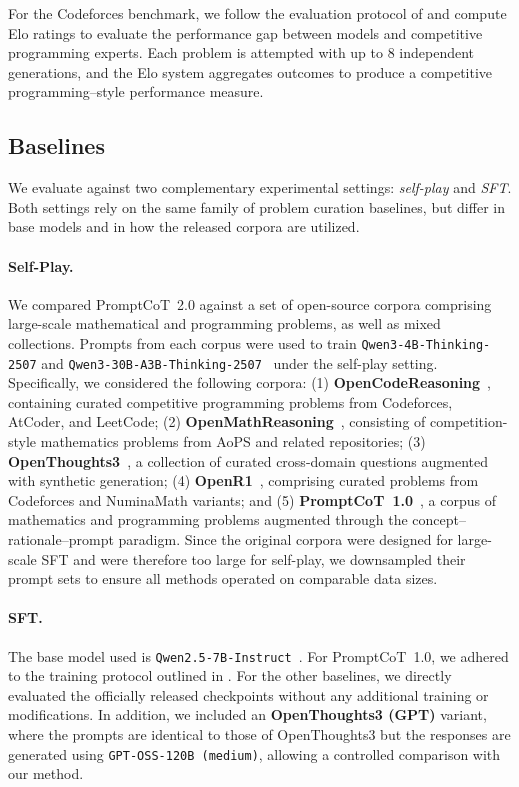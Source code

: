 For the Codeforces benchmark, we follow the evaluation protocol of \citet{luo2025deepcoder} and compute Elo ratings to evaluate the performance gap between models and competitive programming experts.
Each problem is attempted with up to 8 independent generations, and the Elo system aggregates outcomes to produce a competitive programming–style performance measure.  

\subsection{Baselines}

We evaluate against two complementary experimental settings: \emph{self-play} and \emph{SFT}. 
Both settings rely on the same family of problem curation baselines, but differ in base models and in how the released corpora are utilized.

\paragraph{Self-Play.}
We compared PromptCoT~2.0 against a set of open-source corpora comprising large-scale mathematical and programming problems, as well as mixed collections. Prompts from each corpus were used to train \texttt{Qwen3-4B-Thinking-2507} and \texttt{Qwen3-30B-A3B-Thinking-2507}~\citep{yang2025qwen3} under the self-play setting. Specifically, we considered the following corpora:
(1) \textbf{OpenCodeReasoning}~\citep{ahmad2025opencodereasoning}, containing curated competitive programming problems from Codeforces, AtCoder, and LeetCode;
(2) \textbf{OpenMathReasoning}~\citep{moshkov2025aimo}, consisting of competition-style mathematics problems from AoPS and related repositories;
(3) \textbf{OpenThoughts3}~\citep{guha2025openthoughts}, a collection of curated cross-domain questions augmented with synthetic generation;
(4) \textbf{OpenR1}~\citep{openr1}, comprising curated problems from Codeforces and NuminaMath variants; and
(5) \textbf{PromptCoT~1.0}~\citep{zhao2025promptcot,zhao2025scaling}, a corpus of mathematics and programming problems augmented through the concept–rationale–prompt paradigm. Since the original corpora were designed for large-scale SFT and were therefore too large for self-play, we downsampled their prompt sets to ensure all methods operated on comparable data sizes.






\paragraph{SFT.} The base model used is \texttt{Qwen2.5-7B-Instruct}~\citep{yang2024qwen2_5}. For PromptCoT~1.0, we adhered to the training protocol outlined in \citet{zhao2025scaling}. For the other baselines, we directly evaluated the officially released checkpoints without any additional training or modifications. In addition, we included an \textbf{OpenThoughts3 (GPT)} variant, where the prompts are identical to those of OpenThoughts3 but the responses are generated using \texttt{GPT-OSS-120B (medium)}, allowing a controlled comparison with our method.



